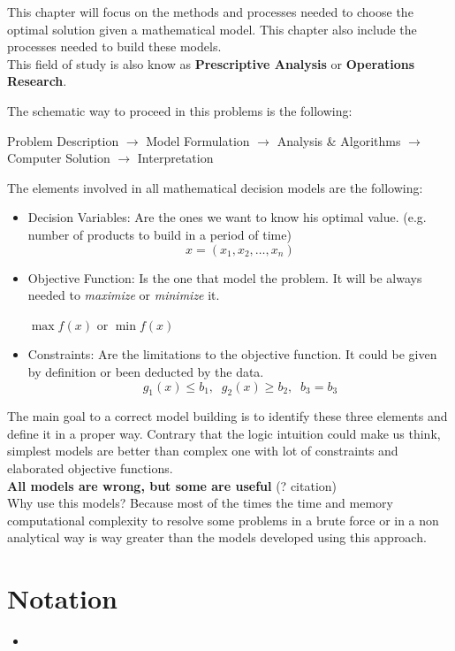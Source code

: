 This chapter will focus on the methods and processes needed to choose the optimal 
solution given a mathematical model. This chapter also include the processes needed to build these models.\\

This field of study is also know as \textbf{Prescriptive Analysis} or \textbf{Operations Research}.

The schematic way to proceed in this problems is the following:
\begin{center}
    Problem Description $\rightarrow$ Model Formulation $\rightarrow$ Analysis \& Algorithms $\rightarrow$
    Computer Solution $\rightarrow$ Interpretation
\end{center}

The elements involved in all mathematical decision models are the following:
\begin{itemize}
    \item Decision Variables: Are the ones we want to know his optimal value. (e.g. number of products to 
    build in a period of time)
        \[ x = (x_1, x_2, \dots , x_n) \]
    \item Objective Function: Is the one that model the problem. It will be always needed to \textit{maximize} or \textit{minimize} it.
    \begin{center}
        $\max f(x)$ or $\min f(x)$
    \end{center}
    \item Constraints: Are the limitations to the objective function. It could be given by definition or been deducted by the data. 
        \[ g_1(x)\leq b_1,\;\; g_2(x)\geq b_2, \;\; b_3=b_3 \]
\end{itemize}

The main goal to a correct model building is to identify these three elements and define it in a proper way. Contrary that the logic 
intuition could make us think, simplest models are better than complex one with lot of constraints and elaborated objective functions. \\

\textbf{All models are wrong, but some are useful} (? citation)\\

Why use this models? Because most of the times the time and memory computational complexity to resolve some problems in a brute force
or in a non analytical way is way greater than the models developed using this approach.

\section{Notation}
\begin{itemize}
    \item 
\end{itemize}


